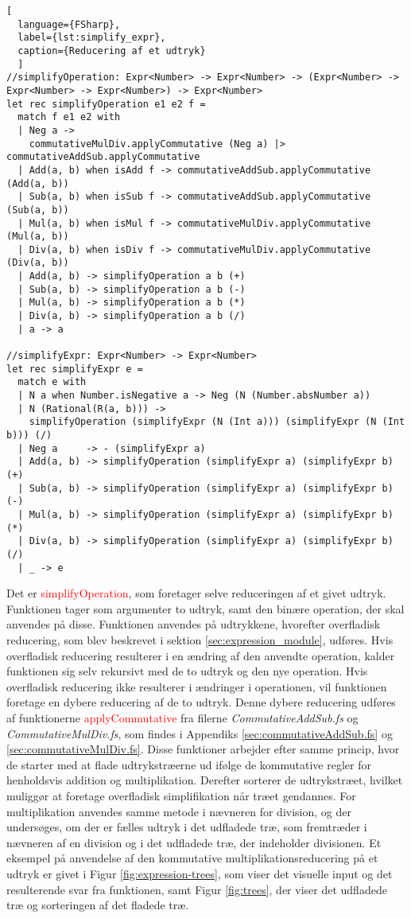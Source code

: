 \begin{lstlisting}[
  language={FSharp}, 
  label={lst:simplify_expr}, 
  caption={Reducering af et udtryk}
  ]
//simplifyOperation: Expr<Number> -> Expr<Number> -> (Expr<Number> -> Expr<Number> -> Expr<Number>) -> Expr<Number>
let rec simplifyOperation e1 e2 f = 
  match f e1 e2 with
  | Neg a -> 
    commutativeMulDiv.applyCommutative (Neg a) |> commutativeAddSub.applyCommutative
  | Add(a, b) when isAdd f -> commutativeAddSub.applyCommutative (Add(a, b))
  | Sub(a, b) when isSub f -> commutativeAddSub.applyCommutative (Sub(a, b))
  | Mul(a, b) when isMul f -> commutativeMulDiv.applyCommutative (Mul(a, b))
  | Div(a, b) when isDiv f -> commutativeMulDiv.applyCommutative (Div(a, b))
  | Add(a, b) -> simplifyOperation a b (+)
  | Sub(a, b) -> simplifyOperation a b (-)
  | Mul(a, b) -> simplifyOperation a b (*)
  | Div(a, b) -> simplifyOperation a b (/)
  | a -> a

//simplifyExpr: Expr<Number> -> Expr<Number>
let rec simplifyExpr e =
  match e with
  | N a when Number.isNegative a -> Neg (N (Number.absNumber a))
  | N (Rational(R(a, b))) -> 
    simplifyOperation (simplifyExpr (N (Int a))) (simplifyExpr (N (Int b))) (/)
  | Neg a     -> - (simplifyExpr a)
  | Add(a, b) -> simplifyOperation (simplifyExpr a) (simplifyExpr b) (+)
  | Sub(a, b) -> simplifyOperation (simplifyExpr a) (simplifyExpr b) (-)
  | Mul(a, b) -> simplifyOperation (simplifyExpr a) (simplifyExpr b) (*)
  | Div(a, b) -> simplifyOperation (simplifyExpr a) (simplifyExpr b) (/)
  | _ -> e 
\end{lstlisting}

Det er \textcolor{red}{simplifyOperation}, som foretager selve reduceringen af et givet udtryk. Funktionen tager som argumenter to udtryk, samt den binære operation, der skal anvendes på disse. Funktionen anvendes på udtrykkene, hvorefter overfladisk reducering, som blev beskrevet i sektion \ref{sec:expression_module}, udføres. Hvis overfladisk reducering resulterer i en ændring af den anvendte operation, kalder funktionen sig selv rekursivt med de to udtryk og den nye operation. Hvis overfladisk reducering ikke resulterer i ændringer i operationen, vil funktionen foretage en dybere reducering af de to udtryk. Denne dybere reducering udføres af funktionerne \textcolor{red}{applyCommutative} fra filerne \textit{CommutativeAddSub.fs} og \textit{CommutativeMulDiv.fs}, som findes i Appendiks \ref{sec:commutativeAddSub.fs} og \ref{sec:commutativeMulDiv.fs}. Disse funktioner arbejder efter samme princip, hvor de starter med at flade udtrykstræerne ud ifølge de kommutative regler for henholdsvis addition og multiplikation. Derefter sorterer de udtrykstræet, hvilket muliggør at foretage overfladisk simplifikation når træet gendannes. For multiplikation anvendes samme metode i nævneren for division, og der undersøges, om der er fælles udtryk i det udfladede træ, som fremtræder i nævneren af en division og i det udfladede træ, der indeholder divisionen. Et eksempel på anvendelse af den kommutative multiplikationsreducering på et udtryk er givet i Figur \ref{fig:expression-trees}, som viser det visuelle input og det resulterende svar fra funktionen, samt Figur \ref{fig:trees}, der viser det udfladede træ og sorteringen af det fladede træ.



